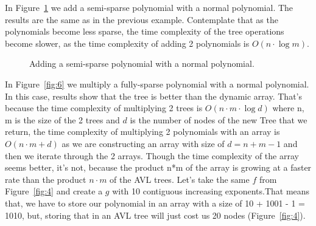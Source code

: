 \documentclass[journal,article,submit,moreauthors,algorithms]{Definitions/mdpi}
\begin{document}
In Figure~\ref{fig:5} we add a semi-sparse polynomial with a normal polynomial. The results are the same as in the previous example. Contemplate that as the polynomials become less sparse, the time complexity of the tree operations become slower, as the time complexity of adding 2 polynomials is $O(n\cdot \log m)$.
\begin{figure}[H] 
\centering
{}
\hfil
{}
\caption{Adding a semi-sparse polynomial with a normal polynomial. }
\label{fig:5}
\end{figure}
In Figure~\ref{fig:6} we multiply a fully-sparse polynomial with a normal polynomial. In this case, results show that the tree is better than the dynamic array. That's because the time complexity of multiplying 2 trees is $O(n \cdot m \cdot \log d)$ where n, m is the size of the 2 trees and $d$ is the number of nodes of the new Tree that we return, the time complexity of multiplying 2 polynomials with an array is $O(n\cdot m + d)$ as we are constructing an array with size of $d = n + m - 1$ and then we iterate through the 2 arrays. Though the time complexity of the array seems better, it's not, because the product n*m of the array is growing at a faster rate than the product $n\cdot m$ of the AVL trees. Let's take the same $f$ from Figure~\ref{fig:4} and create a $g$ with 10 contiguous increasing exponents.That means that, we have to store our polynomial in an array with a size of 10 + 1001 - 1 = 1010, but, storing that in an AVL tree will just cost us 20 nodes (Figure~\ref{fig:4}).
\end{document}
